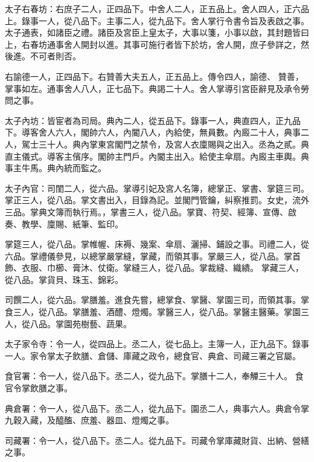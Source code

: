 \begin{pinyinscope}
 太子右春坊：右庶子二人，正四品下。中舍人二人，正五品上。舍人四人，正六品上。錄事一人，從八品下。主事二人，從九品下。舍人掌行令書令旨及表啟之事。太子通表，如諸臣之禮。諸臣及宮臣上皇太子，大事以箋，小事以啟，其封題皆曰上，右春坊通事舍人開封以進。其事可施行者皆下於坊，舍人開，庶子參詳之，然後進。不可者則否。



 右諭德一人，正四品下。右贊善大夫五人，正五品上。傳令四人，諭德、
 贊善，掌事如左。通事舍人八人，正七品下。典謁二十人。舍人掌導引宮臣辭見及承令勞問之事。



 太子內坊：皆宦者為司局。典內二人，從五品下。錄事一人，典直四人，正九品下。導客舍人六人，閣帥六人，內閽八人，內給使，無員數。內廄二十人，典事二人，駕士三十人。典內掌東宮閣門之禁令，及宮人衣廩賜與之出入。丞為之貳。典直主儀式。導客主儐序。閣帥主門戶。內閽主出入。給使主傘扇。內廄主車輿。典事主牛馬。典內統而監之。



 太子內官：司閨二人，從六品。掌導引妃及宮人名簿，總掌正、掌書、掌筵三司。掌正三人，從八品。掌文書出入，目錄為記。並閣門管鑰，糾察推罰。女史，流外三品。掌典文簿而執行焉。，掌書三人，從八品。掌寶、符契、經簿、宣傳、啟奏、教學、廩賜、紙筆、監印。



 掌筵三人，從八品。掌帷幄、床褥、幾案、傘扇、灑掃、鋪設之事。司禮二人，從六品。掌禮儀參見，以總掌嚴掌縫，掌藏，而領其事。掌嚴三人，從八品。掌首飾、衣服、巾櫛、膏沐、仗衛。掌縫三人，從八品。掌裁縫、織繢。
 掌藏三人，從八品。掌貨貝、珠玉、錦彩。



 司饌二人，從六品。掌膳羞。進食先嘗，總掌食、掌醫、掌園三司，而領其事。掌食三人，從八品。掌膳羞、酒醴、燈燭。掌醫三人，從八品。掌醫主醫藥。掌園三人，從八品。掌園苑樹藝、蔬果。



 太子家令寺：令一人，從四品上。丞二人，從七品上。主簿一人，正九品下。錄事一人。家令掌太子飲膳、倉儲、庫藏之政令，總食官、典倉、司藏三署之官屬。



 食官署：令一人，從八品下。丞二人，從九品下。掌膳十二人，奉觶三十人。
 食官令掌飲膳之事。



 典倉署：令一人，從八品下。丞二人，從九品下。園丞二人，典事六人。典倉令掌九穀入藏，及醯醢、庶羞、器皿、燈燭之事。



 司藏署：令一人，從八品下。丞二人。從九品下。司藏令掌庫藏財貨、出納、營繕之事。




\end{pinyinscope}
